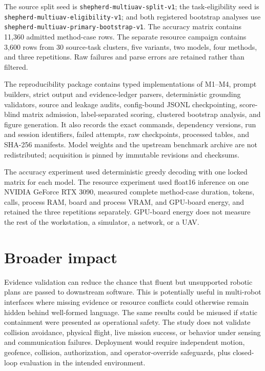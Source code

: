 \documentclass{article}
\begin{document}
The source split seed is
\texttt{shepherd-multiuav-split-v1}; the task-eligibility seed is
\texttt{shepherd-multiuav-eligibility-v1}; and both registered bootstrap
analyses use \texttt{shepherd-multiuav-primary-bootstrap-v1}. The accuracy
matrix contains 11,360 admitted method-case rows. The separate resource
campaign contains 3,600 rows from 30 source-task clusters, five variants, two
models, four methods, and three repetitions. Raw failures and parse errors are
retained rather than filtered.

The reproducibility package contains typed implementations of M1--M4, prompt
builders, strict output and evidence-ledger parsers, deterministic grounding
validators, source and leakage audits, config-bound JSONL checkpointing,
score-blind matrix admission, label-separated scoring, clustered bootstrap
analysis, and figure generation. It also records the exact commands,
dependency versions, run and session identifiers, failed attempts, raw
checkpoints, processed tables, and SHA-256 manifests. Model weights and the
upstream benchmark archive are not redistributed; acquisition is pinned by
immutable revisions and checksums.

The accuracy experiment used deterministic greedy decoding with one locked
matrix for each model. The resource experiment used float16 inference on one
NVIDIA GeForce RTX 3090, measured complete method-case duration, tokens, calls,
process RAM, board and process VRAM, and GPU-board energy, and retained the
three repetitions separately. GPU-board energy does not measure the rest of
the workstation, a simulator, a network, or a UAV.

\section{Broader impact}
\label{app:broader-impact}

Evidence validation can reduce the chance that fluent but unsupported robotic
plans are passed to downstream software. This is potentially useful in
multi-robot interfaces where missing evidence or resource conflicts could
otherwise remain hidden behind well-formed language. The same results could be
misused if static containment were presented as operational safety. The study
does not validate collision avoidance, physical flight, live mission success,
or behavior under sensing and communication failures. Deployment would require
independent motion, geofence, collision, authorization, and operator-override
safeguards, plus closed-loop evaluation in the intended environment.
\end{document}
